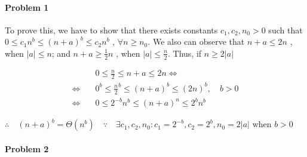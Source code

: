 \documentclass[11pt]{article}
\begin{document}
\MakeScribeTop


\paragraph{\noindent\textbf{\LARGE{Problem 1}}}


\begin{flushleft}
    To prove this, we have to show that there exists constants $c_1, c_2, n_0 > 0$ such that 
    $0 \leq c_1 n^b \leq (n + a)^b \leq c_2 n^b$ , $\forall n \geq n_0 $. 
    \newline \newline
    We also can observe that $n + a \leq 2n$ , when $|a| \leq n$; and $n + a \geq \frac{1}{2}n$ , when $|a| \leq \frac{n}{2}$.
    \newline \newline
    Thus, if $n \geq 2|a|$
\end{flushleft}   
\begin{equation*}
\begin{split}
     & 0 \leq \frac{n}{2} \leq n + a \leq 2n \Leftrightarrow \\
     \Leftrightarrow \quad & 0^b \leq \frac{n}{2}^b \leq (n + a)^b \leq (2n)^b , \quad b > 0 \\
    \Leftrightarrow \quad & 0 \leq 2^{-b} n^b \leq (n + a)^n \leq 2^b n^b
\end{split}
\end{equation*}
\begin{flushleft}
    $\therefore{} \quad (n+a)^b = \Theta(n^b) \quad \because \quad \exists c_1, c_2, n_0 : c_1 = 2^{-b}, c_2 = 2^b, n_0 = 2|a|$ \quad when $b > 0$
\end{flushleft}   

\paragraph{\noindent\textbf{\LARGE{Problem 2}}}
\end{document}
